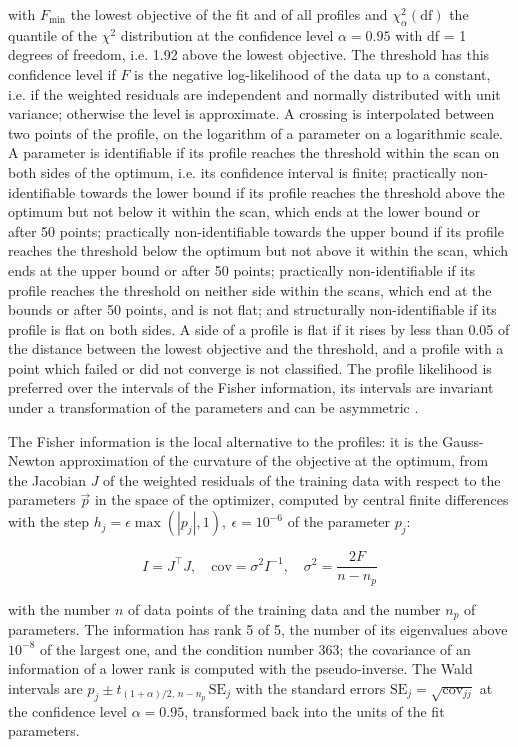 with $F_{\min}$ the lowest objective of the fit and of all profiles and $\chi^2_{\alpha}(\mathrm{df})$ the quantile of the $\chi^2$ distribution at the confidence level $\alpha = 0.95$ with df = 1 degrees of freedom, i.e. 1.92 above the lowest objective. The threshold has this confidence level if $F$ is the negative log-likelihood of the data up to a constant, i.e. if the weighted residuals are independent and normally distributed with unit variance; otherwise the level is approximate. A crossing is interpolated between two points of the profile, on the logarithm of a parameter on a logarithmic scale. A parameter is identifiable if its profile reaches the threshold within the scan on both sides of the optimum, i.e. its confidence interval is finite; practically non-identifiable towards the lower bound if its profile reaches the threshold above the optimum but not below it within the scan, which ends at the lower bound or after 50 points; practically non-identifiable towards the upper bound if its profile reaches the threshold below the optimum but not above it within the scan, which ends at the upper bound or after 50 points; practically non-identifiable if its profile reaches the threshold on neither side within the scans, which end at the bounds or after 50 points, and is not flat; and structurally non-identifiable if its profile is flat on both sides. A side of a profile is flat if it rises by less than 0.05 of the distance between the lowest objective and the threshold, and a profile with a point which failed or did not converge is not classified. The profile likelihood is preferred over the intervals of the Fisher information, its intervals are invariant under a transformation of the parameters and can be asymmetric \cite{Wieland2021}.

The Fisher information is the local alternative to the profiles: it is the Gauss-Newton approximation of the curvature of the objective at the optimum, from the Jacobian $J$ of the weighted residuals of the training data with respect to the parameters $\vec{p}$ in the space of the optimizer, computed by central finite differences with the step $h_j = \epsilon \max(|p_j|, 1),\ \epsilon = 10^{-6}$ of the parameter $p_j$:

\begin{equation}
I = J^\top J, \quad \mathrm{cov} = \sigma^2 I^{-1}, \quad \sigma^2 = \frac{2 F}{n - n_p}
\end{equation}

with the number $n$ of data points of the training data and the number $n_p$ of parameters. The information has rank 5 of 5, the number of its eigenvalues above $10^{-8}$ of the largest one, and the condition number 363; the covariance of an information of a lower rank is computed with the pseudo-inverse. The Wald intervals are $\hat{p}_j \pm t_{(1+\alpha)/2,\, n-n_p}\, \mathrm{SE}_j$ with the standard errors $\mathrm{SE}_j = \sqrt{\mathrm{cov}_{jj}}$ at the confidence level $\alpha = 0.95$, transformed back into the units of the fit parameters.

